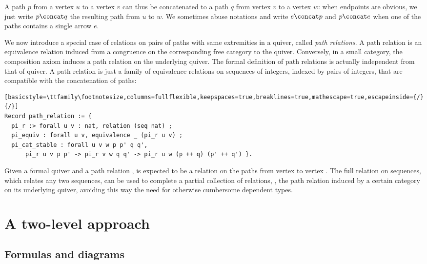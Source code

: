 A path $p$ from a vertex $u$ to a vertex $v$ can thus be concatenated to a path $q$ from vertex $v$ to a vertex $w$: when endpoints are obvious, we just write $p \concat q$ the resulting path from $u$ to $w$. We sometimes abuse notations and write $e \concat p$ and $p \concat e$ when one of the paths contains a single arrow $e$.

We now introduce a special case of relations on pairs of paths with same extremities in a quiver, called \emph{path relations}. A path relation is an equivalence relation induced from a congruence on the corresponding free category to the quiver. Conversely, in a small category, the composition axiom induces a path relation on the underlying quiver. The formal definition of path relations is actually independent from that of quiver. A path relation is just a family of equivalence relations on sequences of integers, indexed by pairs of integers, that are compatible with the concatenation of paths:
\begin{lstlisting}[basicstyle=\ttfamily\footnotesize,columns=fullflexible,keepspaces=true,breaklines=true,mathescape=true,escapeinside={/}{/}]
Record path_relation := {
  pi_r :> forall u v : nat, relation (seq nat) ;
  pi_equiv : forall u v, equivalence _ (pi_r u v) ;
  pi_cat_stable : forall u v w p p' q q',
      pi_r u v p p' -> pi_r v w q q' -> pi_r u w (p ++ q) (p' ++ q') }.
\end{lstlisting}

Given a formal quiver and a path relation ,  is expected to be a relation on the paths from vertex  to vertex . The full relation on sequences, which relates any two sequences, can be used to complete a partial collection of relations, \eg{}, the path relation induced by a certain category on its underlying quiver, avoiding this way the need for otherwise cumbersome dependent types.





\section{A two-level approach}\label{sec:dsl}

\subsection{Formulas and diagrams}\label{ssec:formdiag}

